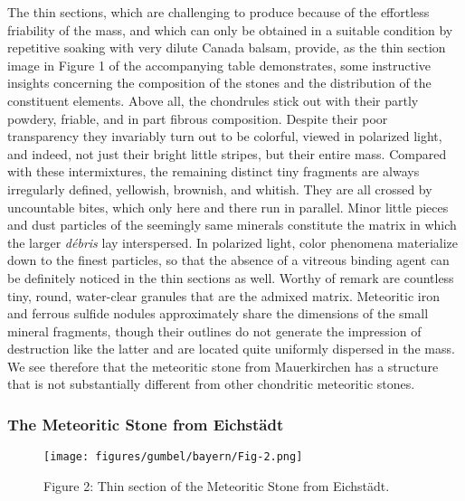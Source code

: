 \documentclass[a4paper, 12pt, oneside]{article}
\begin{document}
The thin sections, which are challenging to produce because of the effortless friability of the mass, and which can only be obtained in a suitable condition by repetitive soaking with very dilute Canada balsam, provide, as the thin section image in Figure 1 of the accompanying table demonstrates, some instructive insights concerning the composition of the stones and the distribution of the constituent elements. Above all, the chondrules stick out with their partly powdery, friable, and in part fibrous composition. Despite their poor transparency they invariably turn out to be colorful, viewed in polarized light, and indeed, not just their bright little stripes, but their entire mass. Compared with these intermixtures, the remaining distinct tiny fragments are always irregularly defined, yellowish, brownish, and whitish. They are all crossed by uncountable bites, which only here and there run in parallel. Minor little pieces and dust particles of the seemingly same minerals constitute the matrix in which the larger \emph{débris} lay interspersed. In polarized light, color phenomena materialize down to the finest particles, so that the absence of a vitreous binding agent can be definitely noticed in the thin sections as well. Worthy of remark are countless tiny, round, water-clear granules that are the admixed matrix. Meteoritic iron and ferrous sulfide nodules approximately share the dimensions of the small mineral fragments, though their outlines do not generate the impression of destruction like the latter and are located quite uniformly dispersed in the mass. We see therefore that the meteoritic stone from Mauerkirchen has a structure that is not substantially different from other chondritic meteoritic stones.
\clearpage
\subsubsection{The Meteoritic Stone from Eichstädt}
\begin{figure}[h]
\centering
\texttt{[image: figures/gumbel/bayern/Fig-2.png]}
\caption{Figure 2: Thin section of the Meteoritic Stone from Eichstädt.}
\end{figure}
\end{document}
